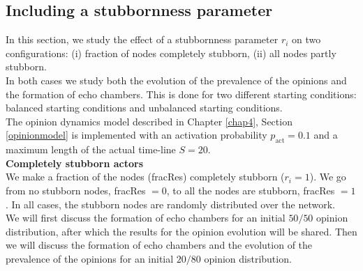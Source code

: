 \documentclass[11 pt , letterpaper , twoside , openright]{book}
\begin{document}
\subsection{Including a stubbornness parameter}
\label{stubbpar}

In this section, we study the effect of a stubbornness parameter $r_i$ on two configurations: (i) fraction of nodes completely stubborn, (ii) all nodes partly stubborn.\\
\newline
In both cases we study both the evolution of the prevalence of the opinions and the formation of echo chambers. This is done for two different starting conditions: balanced starting conditions and unbalanced starting conditions. \\
\newline
The opinion dynamics model described in Chapter \ref{chap4}, Section \ref{opinionmodel} is implemented with an activation probability $p_{\text{act}} = 0.1$ and a maximum length of the actual time-line $S = 20$.\\
\newline
\textbf{Completely stubborn actors}\\
\newline
We make a fraction of the nodes (fracRes) completely stubborn ($r_i = 1$). We go from no stubborn nodes, fracRes $=0$, to all the nodes are stubborn, fracRes $=1$. In all cases, the stubborn nodes are randomly distributed over the network.\\
\newline
We will first discuss the formation of echo chambers for an initial $50/50$ opinion distribution, after which the results for the opinion evolution will be shared. Then we will discuss the formation of echo chambers and the evolution of the prevalence of the opinions for an initial $20/80$ opinion distribution.
\end{document}
